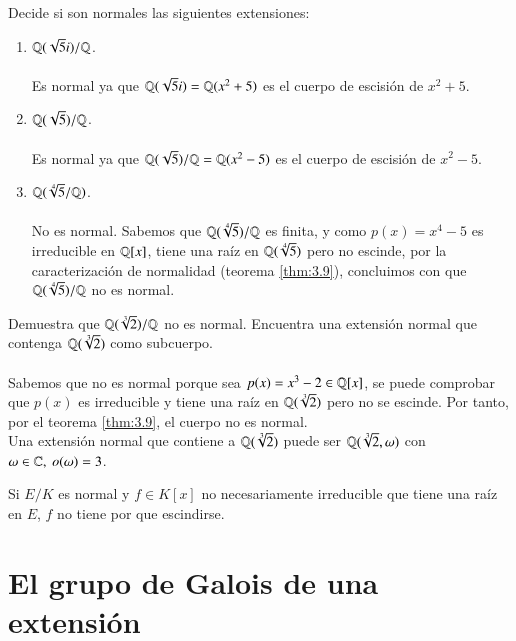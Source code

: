 \begin{ex}[H3.5]
    Decide si son normales las siguientes extensiones:
    \begin{enumerate}
        \item $\mathbb{Q}(\sqrt{5}i)/\mathbb{Q}$.\\\\

        Es normal ya que $\mathbb{Q}(\sqrt{5}i) = \mathbb{Q}(x^2+5)$ es el cuerpo de escisión de $x^2+5$.
        \item $\mathbb{Q}(\sqrt{5})/\mathbb{Q}$.\\\\

        Es normal ya que $\mathbb{Q}(\sqrt{5})/\mathbb{Q} = \mathbb{Q}(x^2-5)$ es el cuerpo de escisión de $x^2-5$.

        \item $\mathbb{Q}(\sqrt[4]{5}/\mathbb{Q})$.\\\\

        No es normal. Sabemos que $\mathbb{Q}(\sqrt[4]{5})/\mathbb{Q}$ es finita, y como $p(x) = x^4 - 5$ es irreducible en $\mathbb{Q}[x]$, tiene una raíz en $\mathbb{Q}(\sqrt[4]{5})$ pero no escinde, por la caracterización de normalidad (teorema \ref{thm:3.9}), concluimos con que $\mathbb{Q}(\sqrt[4]{5})/\mathbb{Q}$ no es normal.
    \end{enumerate}
\end{ex}

\begin{ex}[H3.6]
    Demuestra que $\mathbb{Q}(\sqrt[3]{2})/\mathbb{Q}$ no es normal. Encuentra una extensión normal que contenga $\mathbb{Q}(\sqrt[3]{2})$ como subcuerpo.\\\\

    Sabemos que no es normal porque sea $p(x) = x^3 - 2 \in \mathbb{Q}[x]$, se puede comprobar que $p(x)$ es irreducible y tiene una raíz en $\mathbb{Q}(\sqrt[3]{2})$ pero no se escinde. Por tanto, por el teorema \ref{thm:3.9}, el cuerpo no es normal.\\
    Una extensión normal que contiene a $\mathbb{Q}(\sqrt[3]{2})$ puede ser $\mathbb{Q}(\sqrt[3]{2}, \omega)$ con $\omega \in \mathbb{C},\ o(\omega) = 3$.
\end{ex}

\begin{obs}
    Si $E/K$ es normal y $f\in K[x]$ no necesariamente irreducible que tiene una raíz en $E$, $f$ no tiene por que escindirse.
\end{obs}

\section{El grupo de Galois de una extensi\'on}

